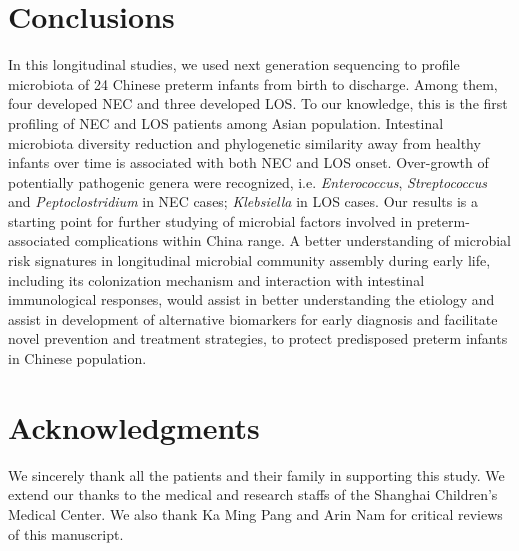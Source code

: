 \documentclass[fleqn,10pt]{wlpeerj} %
\begin{document}
\section*{Conclusions}
In this longitudinal studies, we used next generation sequencing to profile microbiota of 24 Chinese preterm infants from birth to discharge.  Among them, four developed NEC and three developed LOS.  To our knowledge, this is the first profiling of NEC and LOS patients among Asian population. Intestinal microbiota diversity reduction and phylogenetic similarity away from healthy infants over time is associated with both NEC and LOS onset. Over-growth  of potentially pathogenic genera were recognized, i.e. \textit{Enterococcus}, \textit{Streptococcus} and \textit{Peptoclostridium} in NEC cases; \textit{Klebsiella} in LOS cases. Our results is a starting point for further studying of microbial factors involved in preterm-associated complications within China range. A better understanding of microbial risk signatures in longitudinal microbial community assembly during early life, including its colonization mechanism and interaction with intestinal immunological responses, would assist in better understanding the etiology and assist in development of alternative biomarkers for early diagnosis and facilitate novel prevention and treatment strategies, to protect predisposed preterm infants in Chinese population.

\section*{Acknowledgments}
We sincerely thank all the patients and their family  in  supporting  this study. We extend our thanks to the medical and research staffs of the Shanghai Children’s Medical Center.  We also thank Ka Ming Pang and Arin Nam for critical reviews of this manuscript.









\end{document}
